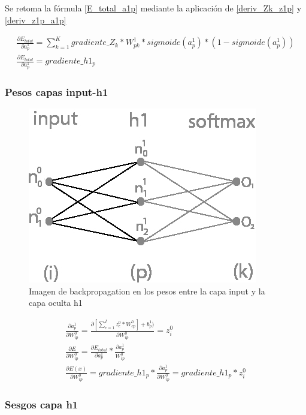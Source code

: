 Se retoma la fórmula \ref{E_total_a1p} mediante la aplicación de \ref{deriv_Zk_z1p} y \ref{deriv_z1p_a1p}

\begin{gather}
	\frac{\partial E_{total}}{\partial a^1_p} = \sum_{k=1}^K  gradiente\_Z_k * W^1_{pk} * sigmoide(a^1_p)*(1-sigmoide(a^1_p)) \\
	\frac{\partial E_{total}}{\partial a^1_p} = gradiente\_h1_p
	\label{grad_E_a1p}
\end{gather}

\subsubsection{Pesos capas input-h1}

\begin{figure}[H]
	\centering
	\includegraphics[scale=0.35]{imagenes/nn_1_capa_pesos_input_h1.jpg}  
	\caption{Imagen de backpropagation en los pesos entre la capa input y la capa oculta h1}
	\label{fig:nn_1_pesos_input_h1}
\end{figure}


\begin{gather}
	\frac{\partial a^1_p }{\partial W^0_{ip} } = \frac{\partial [\sum_{c=1}^{I} z^0_c * W^0_{cp}] + b^1_p)}{\partial W^0_{ip} } = z^0_i \\
	\frac{\partial E}{\partial W^0_{ip}} = \frac{\partial E_{total} }{\partial a^1_p } * \frac{\partial a^1_p}{W^0_{ip}} \\
	\frac{\partial E(x) }{\partial W^0_{ip} } = gradiente\_h1_p * \frac{\partial a^1_p }{\partial W^0_{ip} } = gradiente\_h1_p * z^0_i 
	\label{grad_w0ip}
\end{gather}

\subsubsection{Sesgos capa h1}

